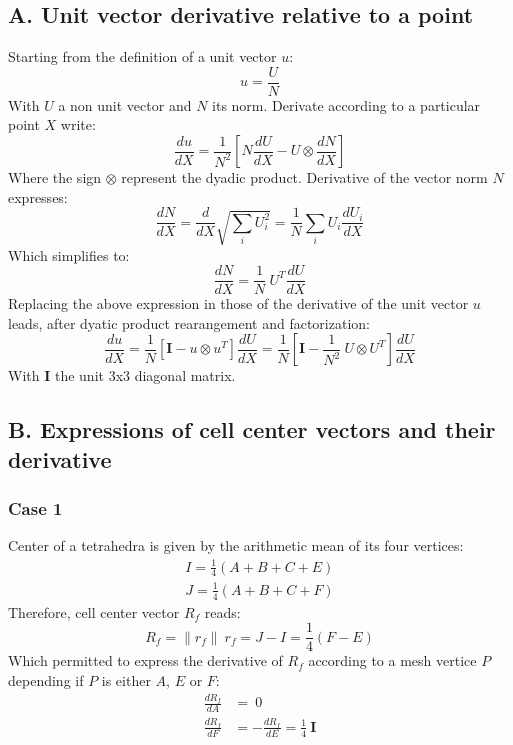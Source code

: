 \documentclass[11pt]{article}
\begin{document}
\subsection*{A. Unit vector derivative relative to a point}
Starting from the definition of a unit vector $u$:
\begin{equation}
u = \frac{U}{N}
\end{equation}
With $U$ a non unit vector and $N$ its norm.
Derivate according to a particular point $X$ write:
\begin{equation}
\frac{du}{dX} = \frac{1}{N^2} \left[ N \frac{dU}{dX} - U \otimes \frac{dN}{dX} \right]
\end{equation}
Where the sign $\otimes$ represent the dyadic product. Derivative of the vector norm $N$ expresses:
\begin{equation}
\frac{dN}{dX} = \frac{d}{dX} \sqrt{\sum_i U_i^2} =
\frac{1}{N} \sum_i U_i \frac{dU_i}{dX}
\end{equation}
Which simplifies to:
\begin{equation}
\frac{dN}{dX} = \frac{1}{N}\ U^T \frac{dU}{dX}
\end{equation}
Replacing the above expression in those of the derivative of the unit vector $u$ leads, after dyatic product rearangement and factorization:
\begin{equation}
\frac{du}{dX} = \frac{1}{N} \left[ \boldsymbol{I} - u \otimes u^T \right] \frac{dU}{dX} = \frac{1}{N} \left[ \boldsymbol{I} - \frac{1}{N^2}\ U \otimes U^T \right] \frac{dU}{dX}
\end{equation}
With $\boldsymbol{I}$ the unit 3x3 diagonal matrix.


\subsection*{B. Expressions of cell center vectors and their derivative}

\subsubsection*{Case 1}

Center of a tetrahedra is given by the arithmetic mean of its four vertices:
\begin{subequations}
\begin{gather}
I = \frac{1}{4} (A + B + C + E) \\
J = \frac{1}{4} (A + B + C + F)
\end{gather}
\end{subequations} 
Therefore, cell center vector $R_f$ reads:
\begin{equation}
R_f = \| r_f \|\ r_f = J-I = \frac{1}{4} (F - E)
\end{equation}
Which permitted to express the derivative of $R_f$ according to a mesh vertice $P$ depending if $P$ is either $A$, $E$ or $F$:
\begin{subequations}
\begin{align}
\frac{d R_f}{d A} &= \ 0 \\
\frac{d R_f}{d F} &= - \frac{d R_f}{d E} = \frac{1}{4}\ \boldsymbol{I}
\end{align}
\end{subequations} 
\end{document}
